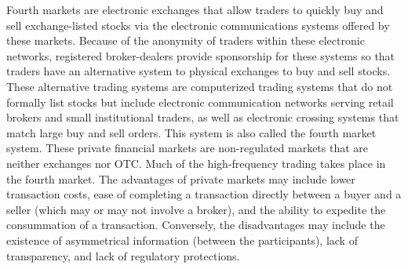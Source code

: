 \documentclass[11pt]{article}
\begin{document}
Fourth markets are electronic exchanges that allow traders to quickly buy and sell exchange-listed stocks via the electronic communications systems offered by these markets. Because of the anonymity of traders within these electronic networks, registered broker-dealers provide sponsorship for these systems so that traders have an alternative system to physical exchanges to buy and sell stocks. These alternative trading systems are computerized trading systems that do not formally list stocks but include electronic communication networks serving retail brokers and small institutional traders, as well as electronic crossing systems that match large buy and sell orders. This system is also called the fourth market system. These private financial markets are non-regulated markets that are neither exchanges nor OTC. Much of the high-frequency trading takes place in the fourth market. The advantages of private markets may include lower transaction costs, ease of completing a transaction directly between a buyer and a seller (which may or may not involve a broker), and the ability to expedite the consummation of a transaction. Conversely, the disadvantages may include the existence of asymmetrical information (between the participants), lack of transparency, and lack of regulatory protections.
\end{document}
